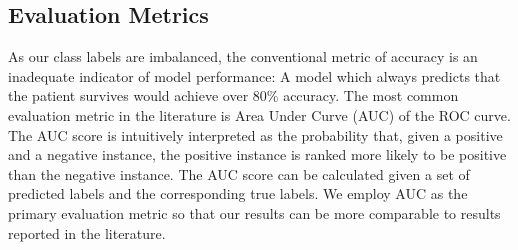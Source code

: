 \documentclass[review]{elsarticle}
\begin{document}
\subsection*{Evaluation Metrics}
As our class labels are imbalanced, the conventional metric of accuracy is an inadequate indicator of model performance: A model which always predicts that the patient survives would achieve over 80\% accuracy. The most common evaluation metric in the literature is Area Under Curve (AUC) of the ROC curve. The AUC score is intuitively interpreted as the probability that, given a positive and a negative instance, the positive instance is ranked more likely to be positive than the negative instance. The AUC score can be calculated given a set of predicted labels and the corresponding true labels. We employ AUC as the primary evaluation metric so that our results can be more comparable to results reported in the literature.
\end{document}
